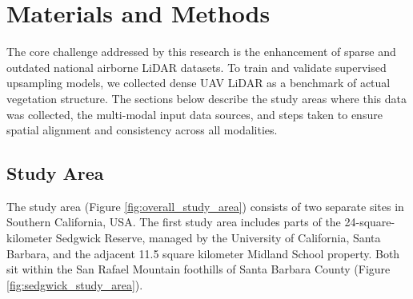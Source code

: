 \documentclass[remotesensing,article,submit,pdftex,moreauthors]{Definitions/mdpi}
\begin{document}
\section{Materials and Methods}



The core challenge addressed by this research is the enhancement of sparse and outdated national airborne LiDAR datasets. To train and validate supervised upsampling models, we collected dense UAV LiDAR as a benchmark of actual vegetation structure. The sections below describe the study areas where this data was collected, the multi-modal input data sources, and steps taken to ensure spatial alignment and consistency across all modalities.


\subsection{Study Area}


The study area (Figure \ref{fig:overall_study_area}) consists of two separate sites in Southern California, USA.
The first study area includes parts of the 24-square-kilometer Sedgwick Reserve, managed by the University of California, Santa Barbara, and the adjacent 11.5 square kilometer Midland School property. Both sit within the San Rafael Mountain foothills of Santa Barbara County (Figure \ref{fig:sedgwick_study_area}). 
\end{document}
